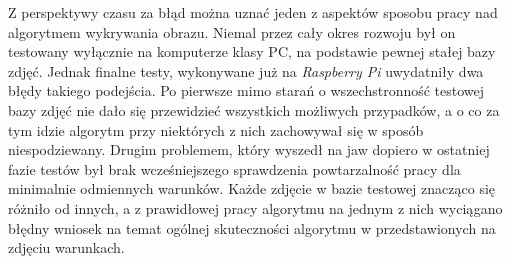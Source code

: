 Z perspektywy czasu za błąd można uznać jeden z aspektów sposobu pracy nad algorytmem wykrywania obrazu. Niemal przez cały okres rozwoju był on testowany wyłącznie na komputerze klasy PC, na podstawie pewnej stałej bazy zdjęć. Jednak finalne testy, wykonywane już na \textit{Raspberry Pi} uwydatniły dwa błędy takiego podejścia. Po pierwsze mimo starań o wszechstronność testowej bazy zdjęć nie dało się przewidzieć wszystkich możliwych przypadków, a o co za tym idzie algorytm przy niektórych z nich zachowywał się w sposób niespodziewany. Drugim problemem, który wyszedł na jaw dopiero w ostatniej fazie testów był brak wcześniejszego sprawdzenia powtarzalność pracy dla minimalnie odmiennych warunków. Każde zdjęcie w bazie testowej znacząco się różniło od innych, a z prawidłowej pracy algorytmu na jednym z nich wyciągano błędny wniosek na temat ogólnej skuteczności algorytmu w przedstawionych na zdjęciu warunkach.